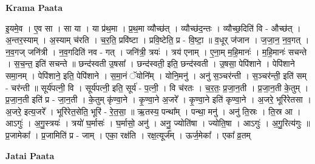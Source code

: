 \documentclass[17pt]{extarticle}
\begin{document}
\textbf{Krama Paata} \newline

इ॒यमे॒व । ए॒व सा । सा या । या प्र॑थ॒मा । प्र॒थ॒मा व्यौच्छ॑त् । व्यौच्छ॑द॒न्तः । व्यौच्छ॒दिति॑ वि - औच्छ॑त् । अ॒न्तर॒स्याम् । अ॒स्याम् च॑रति । च॒र॒ति॒ प्रवि॑ष्टा । प्रवि॒ष्टेति॒ प्र - वि॒ष्टा॒ ॥ व॒धूर् ज॑जान । ज॒जा॒न॒ न॒व॒गत् । न॒व॒गज् जनि॑त्री । न॒व॒गदिति॑ नव - गत् । जनि॑त्री॒ त्रयः॑ । त्रय॑ एनाम् । ए॒ना॒म् म॒हि॒मानः॑ । म॒हि॒मानः॑ सचन्ते । स॒च॒न्त॒ इति॑ सचन्ते ॥ छन्द॑स्वती उ॒षसा᳚ । छन्द॑स्वती॒ इति॒ छन्द॑स्वती । उ॒षसा॒ पेपि॑शाने । पेपि॑शाने समा॒नम् । पेपि॑शाने॒ इति॒ पेपि॑शाने । स॒मा॒नं ॅयोनि᳚म् । योनि॒मनु॑ । अनु॑ स॒ञ्चर॑न्ती । स॒ञ्चर॑न्ती॒ इति॑ सम् - चर॑न्ती ॥ सूर्य॑पत्नी॒ वि । सूर्य॑पत्नी॒ इति॒ सूर्य॑ - प॒त्नी॒ । वि च॑रतः । च॒र॒तः॒ प्र॒जा॒न॒ती । प्र॒जा॒न॒ती के॒तुम् । प्र॒जा॒न॒ती इति॑ प्र - जा॒न॒ती । के॒तुम् कृ॑ण्वा॒ने । कृ॒ण्वा॒ने अ॒जरे᳚ । कृ॒ण्वा॒ने इति॑ कृण्वा॒ने । अ॒जरे॒ भूरि॑रेतसा । अ॒जरे॒ इत्य॒जरे᳚ । भूरि॑रेत॒सेति॒ भूरि॑ - रे॒त॒सा॒ ॥ ऋ॒तस्य॒ पन्था᳚म् । पन्था॒ मनु॑ । अनु॑ ति॒स्रः । ति॒स्र आ । आऽगुः॑ । अ॒गु॒स्त्रयः॑ । त्रयो॑ घ॒र्मासः॑ । घ॒र्मासो॒ अनु॑ । अनु॒ ज्योति॑षा । ज्योति॒षा । आऽगुः॑ । अ॒गु॒रित्य॑गुः ॥ प्र॒जामेका᳚ । प्र॒जामिति॑ प्र - जाम् । एका॒ रक्ष॑ति । रक्ष॒त्यूर्ज᳚म् । ऊर्ज॒मेका᳚ । एका᳚ व्र॒तम् \newline

\textbf{Jatai Paata} \newline
\end{document}
